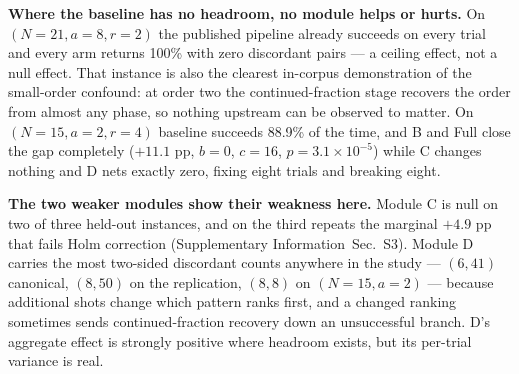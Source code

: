 \documentclass[preprint,11pt]{elsarticle}
\newcommand{\SI}{Supplementary Information}
\newcommand{\SItables}{\SI{}~Sec.~S3}
\begin{document}
\textbf{Where the baseline has no headroom, no module helps or hurts.} On
$(N{=}21,a{=}8,r{=}2)$ the published pipeline already succeeds on every
trial and every arm returns 100\% with zero discordant pairs --- a ceiling
effect, not a null effect. That instance is also the clearest in-corpus
demonstration of the small-order confound: at order two the
continued-fraction stage recovers the order from almost any phase, so
nothing upstream can be observed to matter. On $(N{=}15,a{=}2,r{=}4)$
baseline succeeds 88.9\% of the time, and B and Full close the gap
completely ($+11.1$ pp, $b{=}0$, $c{=}16$, $p=3.1\times10^{-5}$) while C
changes nothing and D nets exactly zero, fixing eight trials and breaking
eight.

\textbf{The two weaker modules show their weakness here.} Module C is
null on two of three held-out instances, and on the third repeats the
marginal $+4.9$ pp that fails Holm correction (\SItables{}).
Module D carries the most two-sided discordant counts anywhere in the
study --- $(6,41)$ canonical, $(8,50)$ on the replication, $(8,8)$ on
$(N{=}15,a{=}2)$ --- because additional shots change which pattern ranks
first, and a changed ranking sometimes sends continued-fraction recovery
down an unsuccessful branch. D's aggregate effect is strongly positive
where headroom exists, but its per-trial variance is real.

\begin{table}[htbp]
\centering\small
\caption{Held-out generalisation: baseline versus the full combination on
all four instances, 144 seed-paired trials each. The three held-out
instances were selected by a rule fixed before any trial of that stage
ran. $b$ = trials the arm broke; $c$ = trials it fixed; $p$ is the exact
two-sided binomial McNemar value, uncorrected (these are replications,
not members of the Holm family, \SItables{}). Per-arm rows for
B, C and D on every instance are in \SItables{}, and are plotted in
Fig.~\ref{fig:heldout}.}
\label{tab:heldout}
\end{table}
\end{document}
